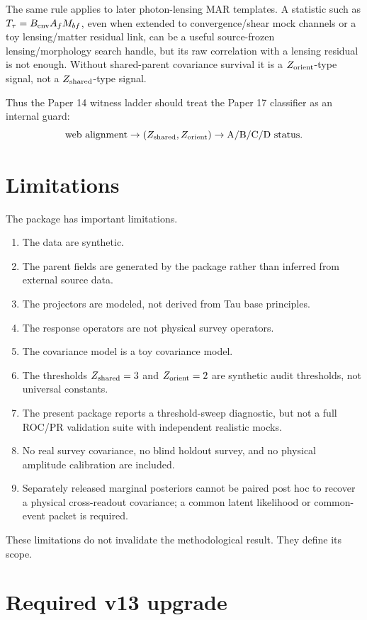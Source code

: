 \documentclass[12pt]{article}
\begin{document}
The same rule applies to later photon-lensing MAR templates.  A statistic such
as \(T_{\tau}=B_{\rm env}A_fM_{bf}\), even when extended to convergence/shear
mock channels or a toy lensing/matter residual link, can be a useful
source-frozen lensing/morphology search handle, but its raw correlation with a
lensing residual is not enough.  Without shared-parent covariance survival it
is a \(Z_{\rm orient}\)-type signal, not a \(Z_{\rm shared}\)-type signal.

Thus the Paper 14 witness ladder should treat the Paper 17 classifier as an
internal guard:
\[
  \text{web alignment}
  \to
  (Z_{\rm shared},Z_{\rm orient})
  \to
  \text{A/B/C/D status}.
\]

\section{Limitations}

The package has important limitations.

\begin{enumerate}[leftmargin=1.4em]
\item The data are synthetic.
\item The parent fields are generated by the package rather than inferred from
external source data.
\item The projectors are modeled, not derived from Tau base principles.
\item The response operators are not physical survey operators.
\item The covariance model is a toy covariance model.
\item The thresholds \(Z_{\rm shared}=3\) and \(Z_{\rm orient}=2\) are synthetic
audit thresholds, not universal constants.
\item The present package reports a threshold-sweep diagnostic, but not a full
ROC/PR validation suite with independent realistic mocks.
\item No real survey covariance, no blind holdout survey, and no physical
amplitude calibration are included.
\item Separately released marginal posteriors cannot be paired post hoc to
recover a physical cross-readout covariance; a common latent likelihood or
common-event packet is required.
\end{enumerate}

These limitations do not invalidate the methodological result.  They define its
scope.

\section{Required v13 upgrade}
\end{document}
